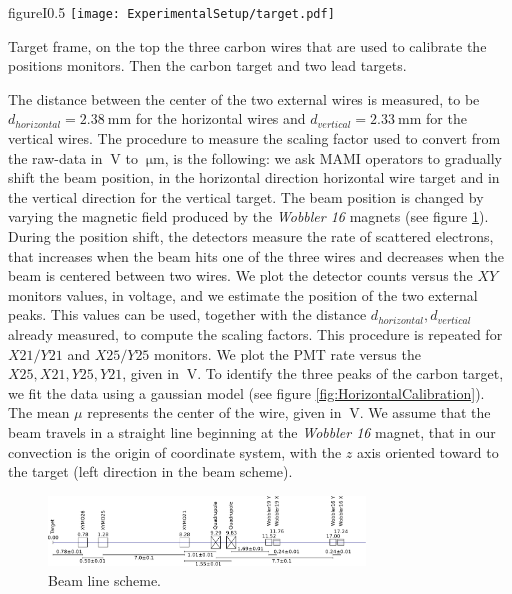 \begin{wrapfloat}{figure}{I}{0.5\textwidth}
\centering
\texttt{[image: ExperimentalSetup/target.pdf]}
\caption{\label{fig:targetFrame} Target frame, on the top the three carbon wires that are used to calibrate the positions monitors. Then the carbon target and two lead targets.}
\vspace{-0pt}
\end{wrapfloat}

The distance between the center of the two external wires is measured, to be $ d_{horizontal} = \SI{2.38}{\milli \meter}$ for the horizontal wires and $d_{vertical} = \SI{2.33}{\milli \meter}$ for the vertical wires. The procedure to measure the scaling factor used to convert from the raw-data in $\SI{}{\volt}$ to $\SI{}{\micro \meter}$, is the following: we ask MAMI operators to gradually shift the beam position, in the horizontal direction horizontal wire target and in the vertical direction for the vertical target. The beam position is changed by varying the magnetic field produced by the \textit{Wobbler 16} magnets (see figure \ref{fig:BeamLine}). During the position shift, the detectors measure the rate of scattered electrons, that increases when the beam hits one of the three wires and decreases when the beam is centered between two wires. We plot the detector counts versus the $XY$ monitors values, in voltage, and we estimate the position of the two external peaks. This values can be used, together with the distance $d_{horizontal},d_{vertical}$ already measured, to compute the scaling factors. This procedure is repeated for $X21/Y21$ and $X25/Y25$ monitors. We plot the PMT rate versus the $X25,X21,Y25,Y21$, given in $\SI{}{\volt}$. 
To identify the three peaks of the carbon target, we fit the data using a gaussian model (see figure \ref{fig:HorizontalCalibration}). The mean $\mu$ represents the center of the wire, given in $\SI{}{\volt}$.
We assume that the beam travels in a straight line beginning at the \textit{Wobbler 16} magnet, that in our convection is the origin of coordinate system, with the $z$ axis oriented toward to the target (left direction in the beam scheme).
\begin{figure}[hbtp]
\centering
\includegraphics[width = 0.75\textwidth]{figures/XYMOCalibBeamLine.pdf}
\caption{Beam line scheme.}
\label{fig:BeamLine}
\end{figure} 

